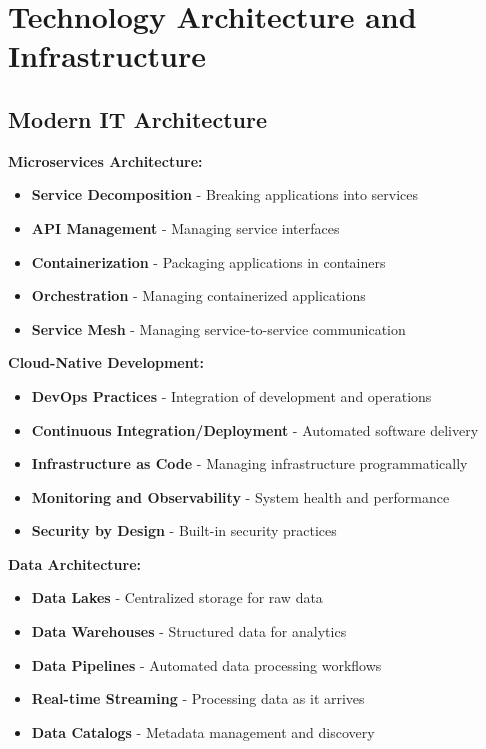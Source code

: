 \documentclass[12pt]{article}
\begin{document}
\section{Technology Architecture and Infrastructure}

\subsection{Modern IT Architecture}

\textbf{Microservices Architecture:}
\begin{itemize}
    \item \textbf{Service Decomposition} - Breaking applications into services
    \item \textbf{API Management} - Managing service interfaces
    \item \textbf{Containerization} - Packaging applications in containers
    \item \textbf{Orchestration} - Managing containerized applications
    \item \textbf{Service Mesh} - Managing service-to-service communication
\end{itemize}

\textbf{Cloud-Native Development:}
\begin{itemize}
    \item \textbf{DevOps Practices} - Integration of development and operations
    \item \textbf{Continuous Integration/Deployment} - Automated software delivery
    \item \textbf{Infrastructure as Code} - Managing infrastructure programmatically
    \item \textbf{Monitoring and Observability} - System health and performance
    \item \textbf{Security by Design} - Built-in security practices
\end{itemize}

\textbf{Data Architecture:}
\begin{itemize}
    \item \textbf{Data Lakes} - Centralized storage for raw data
    \item \textbf{Data Warehouses} - Structured data for analytics
    \item \textbf{Data Pipelines} - Automated data processing workflows
    \item \textbf{Real-time Streaming} - Processing data as it arrives
    \item \textbf{Data Catalogs} - Metadata management and discovery
\end{itemize}
\end{document}
